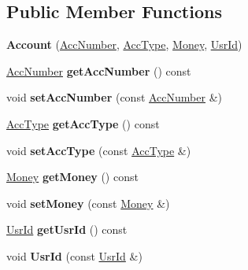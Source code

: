 \subsection*{Public Member Functions}
\begin{DoxyCompactItemize}
\item 
\hypertarget{classAccount_af138fcdd8d26f765f8abe5bb56d4ad2f}{{\bfseries Account} (\hyperlink{classAccNumber}{Acc\-Number}, \hyperlink{classUsrType}{Acc\-Type}, \hyperlink{classMoney}{Money}, \hyperlink{classUsrId}{Usr\-Id})}\label{classAccount_af138fcdd8d26f765f8abe5bb56d4ad2f}

\item 
\hypertarget{classAccount_a74f26f24e13e66a055bb8441dfb3d881}{\hyperlink{classAccNumber}{Acc\-Number} {\bfseries get\-Acc\-Number} () const }\label{classAccount_a74f26f24e13e66a055bb8441dfb3d881}

\item 
\hypertarget{classAccount_a3e669090168f13d2a8269af456546a1e}{void {\bfseries set\-Acc\-Number} (const \hyperlink{classAccNumber}{Acc\-Number} \&)}\label{classAccount_a3e669090168f13d2a8269af456546a1e}

\item 
\hypertarget{classAccount_a34e1f7e507d7abdf575e4833d6f8d36b}{\hyperlink{classUsrType}{Acc\-Type} {\bfseries get\-Acc\-Type} () const }\label{classAccount_a34e1f7e507d7abdf575e4833d6f8d36b}

\item 
\hypertarget{classAccount_a3a8e8aa0094b2af0496d45714f694256}{void {\bfseries set\-Acc\-Type} (const \hyperlink{classUsrType}{Acc\-Type} \&)}\label{classAccount_a3a8e8aa0094b2af0496d45714f694256}

\item 
\hypertarget{classAccount_a95ade3f39d575c052f552d92940bbdb9}{\hyperlink{classMoney}{Money} {\bfseries get\-Money} () const }\label{classAccount_a95ade3f39d575c052f552d92940bbdb9}

\item 
\hypertarget{classAccount_afd2ca329c9b1cd62bd4092ad6eece944}{void {\bfseries set\-Money} (const \hyperlink{classMoney}{Money} \&)}\label{classAccount_afd2ca329c9b1cd62bd4092ad6eece944}

\item 
\hypertarget{classAccount_a59a83e5c5142f79402e79a8d42b36aed}{\hyperlink{classUsrId}{Usr\-Id} {\bfseries get\-Usr\-Id} () const }\label{classAccount_a59a83e5c5142f79402e79a8d42b36aed}

\item 
\hypertarget{classAccount_a06b7f265101bda09de561195387234bf}{void {\bfseries Usr\-Id} (const \hyperlink{classUsrId}{Usr\-Id} \&)}\label{classAccount_a06b7f265101bda09de561195387234bf}

\end{DoxyCompactItemize}


